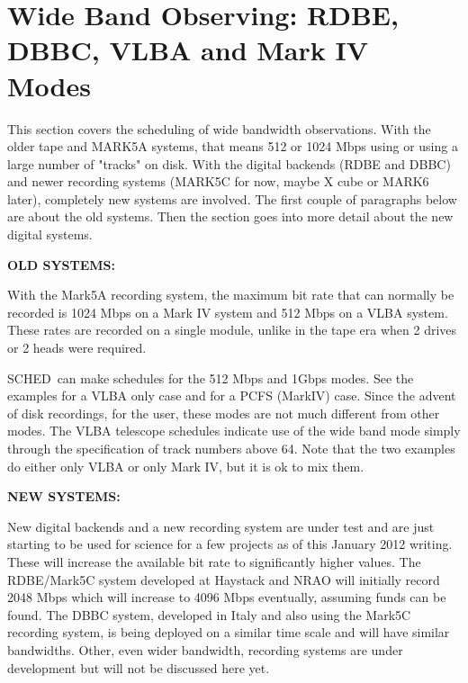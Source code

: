 \documentclass{report}
\newcommand{\schedb}{{\sc SCHED~}}
\begin{document}
\section{\label{SEC:WIDE}Wide Band Observing: RDBE, DBBC, VLBA and
Mark IV Modes}

This section covers the scheduling of wide bandwidth observations.
With the older tape and MARK5A systems, that means 512 or 1024 Mbps
using or using a large number of "tracks" on disk.  With the digital
backends (RDBE and DBBC) and newer recording systems (MARK5C for now,
maybe X cube or MARK6 later), completely new systems are involved.
The first couple of paragraphs below are about the old systems.  Then
the section goes into more detail about the new digital systems.

{\bf OLD SYSTEMS:}

With the Mark5A recording system, the maximum bit rate that can
normally be recorded is 1024 Mbps on a Mark IV system and 512 Mbps
on a VLBA system.  These rates are recorded on a single module, unlike
in the tape era when 2 drives or 2 heads were required.

\schedb can make schedules for the 512 Mbps and 1Gbps modes.  See the
examples  for a
VLBA only case and  for a PCFS (MarkIV) case.  Since the
advent of disk recordings, for the
user, these modes are not much different from other modes.  The
VLBA telescope schedules indicate use of the wide band mode simply
through the specification of track numbers above 64.  Note that the
two examples do either only VLBA or only Mark IV, but it is ok to mix
them.

{\bf NEW SYSTEMS:}

New digital backends and a new recording system are under test and are
just starting to be used for science for a few projects as of this
January 2012 writing.  These will increase the available bit rate to
significantly higher values.  The RDBE/Mark5C system developed at
Haystack and NRAO will initially record 2048 Mbps which will increase
to 4096 Mbps eventually, assuming funds can be found.  The DBBC
system, developed in Italy and also using the Mark5C recording system,
is being deployed on a similar time scale and will have similar
bandwidths.  Other, even wider bandwidth, recording systems are under
development but will not be discussed here yet.
\end{document}
